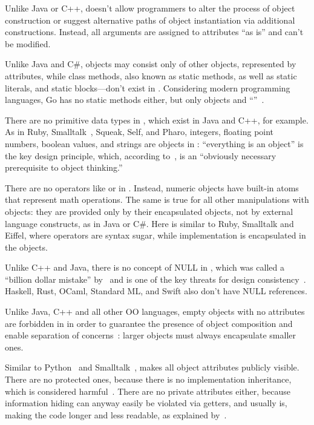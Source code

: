 %
Unlike Java or C++, \eo{} doesn't allow programmers to alter
the process of object construction or suggest alternative
paths of object instantiation via additional constructions.
Instead, all arguments are assigned to attributes ``as is'' and can't be modified.

%
Unlike Java and C\#,
\eo{} objects may consist only of other objects, represented
by attributes, while class methods, also known as static methods, as well as
static literals, and static blocks---don't exist in \eo{}.
Considering modern programming languages, Go has no static methods either,
but only objects and ``''~\citep{schmager2010gohotdraw}.

%
There are no primitive data types in \eo{}, which
exist in Java and C++, for example.
As in Ruby, Smalltalk~\citep*{goldbergrobson1983smalltalk}, Squeak, Self, and Pharo,
integers, floating point numbers, boolean
values, and strings are objects in \eo{}:
``everything is an object'' is the key design principle, which,
according to~\citet[p.66]{west2004object}, is an ``obviously necessary prerequisite
to object thinking.''

%
There are no operators like \ff{+} or \ff{/} in \eo{}. Instead,
numeric objects have built-in atoms that represent math operations. The same
is true for all other manipulations with objects: they are provided
only by their encapsulated objects, not by external language constructs, as in
Java or C\#. Here \eo{} is similar to Ruby, Smalltalk and Eiffel,
where operators are syntax sugar, while implementation is encapsulated in
the objects.

%
Unlike C++ and Java, there is no concept of NULL in \eo{}, which
was called a ``billion dollar mistake'' by~\citet{hoare2009null} and
is one of the key threats for design consistency~\citep{eo1}.
Haskell, Rust, OCaml, Standard ML, and Swift also don't have NULL references.

%
Unlike Java, C++ and all other OO languages,
empty objects with no attributes are forbidden in \eo{} in order
to guarantee the presence of object composition and
enable separation of concerns~\citep{dijkstra1982role}:
larger objects must always encapsulate smaller ones.

%
Similar to Python~\citep{lutz2013learning} and Smalltalk~\citep{hunt1997smalltalk},
\eo{} makes all object attributes publicly visible.
There are no protected ones, because there is no implementation
inheritance, which is considered harmful~\citep{hunt2000}.
There are no private attributes either, because information
hiding can anyway easily be violated via getters, and usually is, making the code longer
and less readable, as explained by~\citet{holub2004more}.

